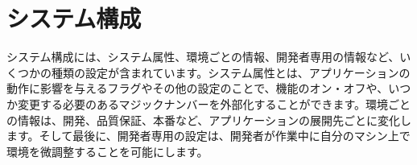 \section{システム構成}

システム構成には、システム属性、環境ごとの情報、開発者専用の情報など、いくつかの種類の設定が含まれています。システム属性とは、アプリケーションの動作に影響を与えるフラグやその他の設定のことで、機能のオン・オフや、いつか変更する必要のあるマジックナンバーを外部化することができます。環境ごとの情報は、開発、品質保証、本番など、アプリケーションの展開先ごとに変化します。そして最後に、開発者専用の設定は、開発者が作業中に自分のマシン上で環境を微調整することを可能にします。









